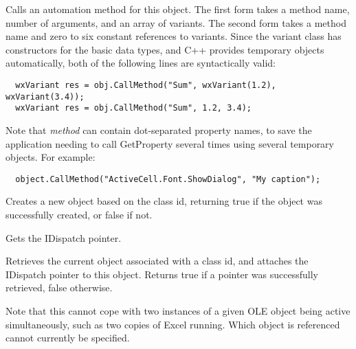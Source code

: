 

Calls an automation method for this object. The first form takes a method name, number of
arguments, and an array of variants. The second form takes a method name and zero to six
constant references to variants. Since the variant class has constructors for the basic
data types, and C++ provides temporary objects automatically, both of the following lines
are syntactically valid:

{\small
\begin{verbatim}
  wxVariant res = obj.CallMethod("Sum", wxVariant(1.2), wxVariant(3.4));
  wxVariant res = obj.CallMethod("Sum", 1.2, 3.4);
\end{verbatim}
}

Note that {\it method} can contain dot-separated property names, to save the application
needing to call GetProperty several times using several temporary objects. For example:

{\small
\begin{verbatim}
  object.CallMethod("ActiveCell.Font.ShowDialog", "My caption");
\end{verbatim}
}

\label{wxautomationobjectcreateinstance}


Creates a new object based on the class id, returning true if the object was successfully created,
or false if not.

\label{wxautomationobjectgetdispatchptr}


Gets the IDispatch pointer.

\label{wxautomationobjectgetinstance}


Retrieves the current object associated with a class id, and attaches the IDispatch pointer
to this object. Returns true if a pointer was successfully retrieved, false otherwise.

Note that this cannot cope with two instances of a given OLE object being active simultaneously,
such as two copies of Excel running. Which object is referenced cannot currently be specified.

